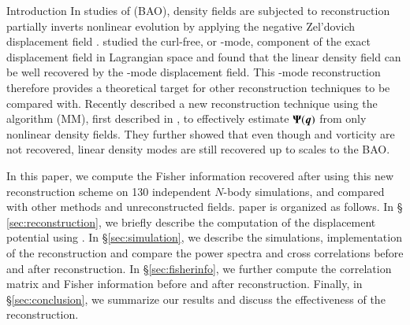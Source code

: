 \begin{section}{Introduction}
  In studies of  (BAO), density fields are
  subjected to reconstruction  partially inverts nonlinear
  evolution by applying the negative Zel'dovich displacement field \citep{bib:Eisenstein2007,bib:Zel1970}.
  \citet{bib:Yu2016} studied the curl-free, or -mode, component of 
  the exact displacement field in Lagrangian
  space and found that the linear density field can be well recovered by
  the -mode displacement field.
  This -mode reconstruction therefore provides a theoretical 
  target for other reconstruction techniques to be compared with.
  Recently \citet{bib:Zhu2016,bib:ZhuH2016} described a new reconstruction 
  technique using the 
  algorithm (MM), first described in \citep{bib:Pen1995,bib:Pen1998},
  to effectively estimate $\boldsymbol{\Psi}(\boldsymbol{q})$ from only nonlinear
  density fields.  They further showed that even though 
  and vorticity are not recovered, linear density modes are still 
  recovered up to scales  to the BAO.

  In this paper, we compute the Fisher information recovered after
  using this new reconstruction scheme on 130 independent $N$-body
  simulations, and compared with other methods and unreconstructed
  fields.   paper is organized as follows.  In \S
  \ref{sec:reconstruction}, we briefly
  describe the computation of the displacement potential using .
  In \S \ref{sec:simulation}, we describe  
  the simulations, implementation of the reconstruction and compare 
  the power spectra and cross correlations before and after reconstruction.  
  In \S \ref{sec:fisherinfo}, we further compute the correlation matrix 
  and Fisher information before and
  after reconstruction.  Finally, in \S \ref{sec:conclusion}, we summarize 
  our results and 
  discuss the effectiveness of the reconstruction.


\end{section}

